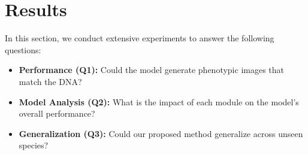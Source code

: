 


\section{Results}
\label{sec:experiments}
In this section, we conduct extensive experiments to answer the following questions: 
\begin{itemize}[leftmargin=5.5mm]

  \item \textbf{Performance (Q1):} 
  Could the model generate phenotypic images that match the DNA?
  \item \textbf{Model Analysis (Q2):} What is the impact of each module on the model's overall performance?
  \item \textbf{Generalization (Q3):} Could our proposed method generalize across unseen species?
\end{itemize}




